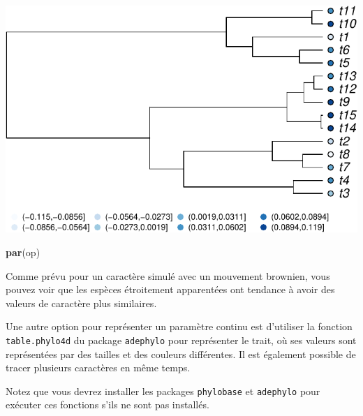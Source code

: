 \documentclass[
]{book}
\newenvironment{Shaded}{\begin{snugshade}}{\end{snugshade}}
\newcommand{\FunctionTok}[1]{\textcolor[rgb]{0.13,0.29,0.53}{\textbf{#1}}}
\newcommand{\NormalTok}[1]{#1}
\begin{document}
\includegraphics{pcm-workshop_files/figure-latex/Plot continuous parameter-1.pdf}

\begin{Shaded}
\begin{Highlighting}[]
\FunctionTok{par}\NormalTok{(op)}
\end{Highlighting}
\end{Shaded}

Comme prévu pour un caractère simulé avec un mouvement brownien, vous pouvez voir que les espèces étroitement apparentées ont tendance à avoir des valeurs de caractère plus similaires.

Une autre option pour représenter un paramètre continu est d'utiliser la fonction \texttt{table.phylo4d} du package \texttt{adephylo} pour représenter le trait, où ses valeurs sont représentées par des tailles et des couleurs différentes. Il est également possible de tracer plusieurs caractères en même temps.

Notez que vous devrez installer les packages \texttt{phylobase} et \texttt{adephylo} pour exécuter ces fonctions s'ils ne sont pas installés.
\end{document}
